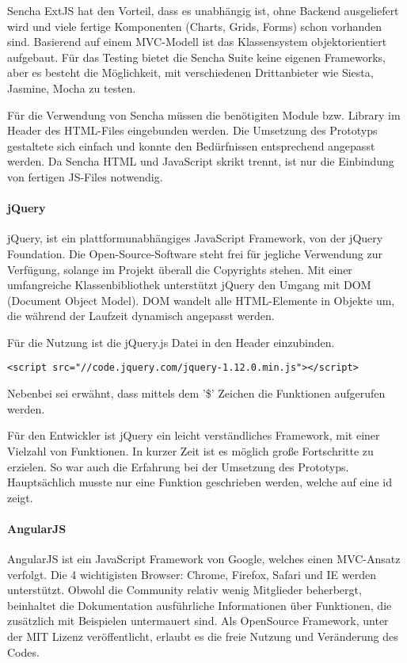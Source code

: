 Sencha ExtJS hat den Vorteil, dass es unabhängig ist, ohne Backend ausgeliefert wird und viele fertige Komponenten (Charts, Grids, Forms) schon vorhanden sind. Basierend auf einem MVC-Modell ist das Klassensystem objektorientiert aufgebaut. Für das Testing bietet die Sencha Suite keine eigenen Frameworks, aber es besteht die Möglichkeit, mit verschiedenen Drittanbieter wie \grqq{}Siesta, Jasmine, Mocha\grqq{} zu testen.\cite{SENCHAFEATURES}\cite{SENCHALICENSE}

Für die Verwendung von Sencha müssen die benötigiten Module bzw. Library im Header des HTML-Files eingebunden werden. Die Umsetzung des Prototyps gestaltete sich einfach und konnte den Bedürfnissen entsprechend angepasst werden. Da Sencha HTML und JavaScript skrikt trennt, ist nur die Einbindung von fertigen JS-Files notwendig.

\paragraph{jQuery}
jQuery, ist ein plattformunabhängiges JavaScript Framework, von der jQuery Foundation. Die Open-Source-Software steht frei für jegliche Verwendung zur Verfügung, solange im Projekt überall die Copyrights stehen. Mit einer umfangreiche Klassenbibliothek unterstützt jQuery den Umgang mit DOM (Document Object Model). DOM wandelt alle HTML-Elemente in Objekte um, die während der Laufzeit dynamisch angepasst werden.\cite{JQUERY} 

Für die Nutzung ist die jQuery.js Datei in den Header einzubinden.
\begin{lstlisting}[caption={jQuery einbinden\cite{JQUERYDOWN}}]
<script src="//code.jquery.com/jquery-1.12.0.min.js"></script>
\end{lstlisting}
Nebenbei sei erwähnt, dass mittels dem '\$' Zeichen die Funktionen aufgerufen werden.

Für den Entwickler ist jQuery ein leicht verständliches Framework, mit einer Vielzahl von Funktionen. In kurzer Zeit ist es möglich große Fortschritte zu erzielen. So war auch die Erfahrung bei der Umsetzung des Prototyps. Hauptsächlich musste nur eine Funktion geschrieben werden, welche auf eine id zeigt. \cite{JQUERYTOOL}

\paragraph{AngularJS}
AngularJS ist ein JavaScript Framework von Google, welches einen MVC-Ansatz verfolgt. Die 4 wichtigisten Browser: Chrome, Firefox, Safari und IE werden unterstützt. Obwohl die Community relativ wenig Mitglieder beherbergt, beinhaltet die Dokumentation ausführliche Informationen über Funktionen, die zusätzlich mit Beispielen untermauert sind. Als OpenSource Framework, unter der MIT Lizenz veröffentlicht, erlaubt es die freie Nutzung und Veränderung des Codes.

